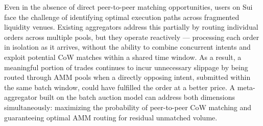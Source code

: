 Even in the absence of direct peer-to-peer matching opportunities, users on Sui face the challenge of identifying optimal execution paths across fragmented liquidity venues. Existing aggregators address this partially by routing individual orders across multiple pools, but they operate reactively --- processing each order in isolation as it arrives, without the ability to combine concurrent intents and exploit potential CoW matches within a shared time window. As a result, a meaningful portion of trades continues to incur unnecessary slippage by being routed through AMM pools when a directly opposing intent, submitted within the same batch window, could have fulfilled the order at a better price. A meta-aggregator built on the batch auction model can address both dimensions simultaneously: maximizing the probability of peer-to-peer CoW matching and guaranteeing optimal AMM routing for residual unmatched volume.


